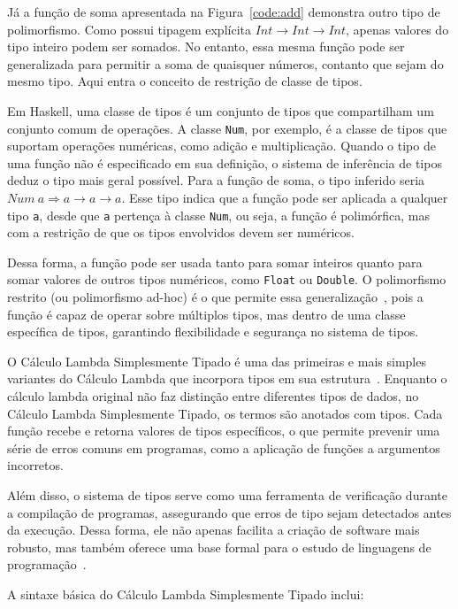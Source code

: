 Já a função de soma apresentada na Figura~\ref{code:add} demonstra outro tipo de polimorfismo.
Como possui tipagem explícita $Int \rightarrow Int \rightarrow Int$, apenas valores do tipo inteiro podem ser somados.
No entanto, essa mesma função pode ser generalizada para permitir a soma de quaisquer números, contanto que sejam do mesmo tipo.
Aqui entra o conceito de restrição de classe de tipos.

Em Haskell, uma classe de tipos é um conjunto de tipos que compartilham um conjunto comum de operações.
A classe \texttt{Num}, por exemplo, é a classe de tipos que suportam operações numéricas, como adição e multiplicação.
Quando o tipo de uma função não é especificado em sua definição, o sistema de inferência de tipos deduz o tipo mais geral possível.
Para a função de soma, o tipo inferido seria $Num\ a \Rightarrow a \rightarrow a \rightarrow a$.
Esse tipo indica que a função pode ser aplicada a qualquer tipo \texttt{a}, desde que \texttt{a} pertença à classe \texttt{Num}, ou seja, a função é polimórfica, mas com a restrição de que os tipos envolvidos devem ser numéricos.

Dessa forma, a função pode ser usada tanto para somar inteiros quanto para somar valores de outros tipos numéricos, como \texttt{Float} ou \texttt{Double}.
O polimorfismo restrito (ou polimorfismo ad-hoc) é o que permite essa generalização~\cite{PIERCE2002}, pois a função é capaz de operar sobre múltiplos tipos, mas dentro de uma classe específica de tipos, garantindo flexibilidade e segurança no sistema de tipos.

O Cálculo Lambda Simplesmente Tipado é uma das primeiras e mais simples variantes do Cálculo Lambda que incorpora tipos em sua estrutura~\cite{CHURCH1940}.
Enquanto o cálculo lambda original não faz distinção entre diferentes tipos de dados, no Cálculo Lambda Simplesmente Tipado, os termos são anotados com tipos.
Cada função recebe e retorna valores de tipos específicos, o que permite prevenir uma série de erros comuns em programas, como a aplicação de funções a argumentos incorretos.

Além disso, o sistema de tipos serve como uma ferramenta de verificação durante a compilação de programas, assegurando que erros de tipo sejam detectados antes da execução.
Dessa forma, ele não apenas facilita a criação de software mais robusto, mas também oferece uma base formal para o estudo de linguagens de programação~\cite{PIERCE2002}.

A sintaxe básica do Cálculo Lambda Simplesmente Tipado inclui:

